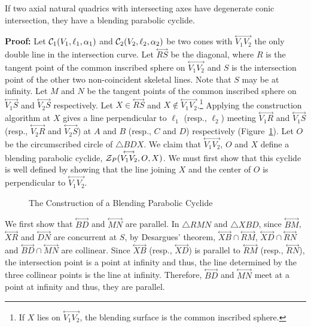 \begin{lemma}
\label{lemma:three-line-cyclide}
     If two axial natural quadrics with intersecting axes have degenerate conic
intersection, they have a blending parabolic cyclide.
\end{lemma}
{\bf Proof:}  Let ${\cal C}_1(V_1,\ell_1,\alpha_1)$ and
${\cal C}_2(V_2,\ell_2,\alpha_2)$ be two cones with
$\stackrel{\longleftrightarrow}{V_1V_2}$ the only double line in the
intersection curve.  Let $\stackrel{\longleftrightarrow}{RS}$ be the diagonal,
where $R$ is the tangent point of the common inscribed 
sphere on $\stackrel{\longleftrightarrow}{V_1V_2}$ and $S$ is the intersection
point of the other two non-coincident skeletal lines.  Note that $S$ may be
at infinity.  Let $M$ and $N$ be the tangent points of the common inscribed 
sphere on $\stackrel{\longleftrightarrow}{V_1S}$ and
$\stackrel{\longleftrightarrow}{V_2S}$ respectively.
Let $X\in\stackrel{\longleftrightarrow}{RS}$ and 
$X\not\in\stackrel{\longleftrightarrow}{V_1V_2}$.\footnote{If $X$ lies on
$\stackrel{\longleftrightarrow}{V_1V_2}$, the blending surface is the common
inscribed sphere.}
Applying the construction algorithm at $X$ gives a
line perpendicular to $\ell_1$ (resp., $\ell_2$) meeting
$\stackrel{\longleftrightarrow}{V_1R}$ and
$\stackrel{\longleftrightarrow}{V_1S}$ (resp.,
$\stackrel{\longleftrightarrow}{V_2R}$ and
$\stackrel{\longleftrightarrow}{V_2S}$) at $A$ and $B$ (resp., $C$ and $D$)
respectively (Figure~\ref{fig:parabolic-construct}).  Let $O$ be the 
circumscribed circle of $\bigtriangleup BDX$.  We claim that 
$\stackrel{\longleftrightarrow}{V_1V_2}$, $O$ and $X$ define a blending
parabolic cyclide, ${\cal Z}_P(\stackrel{\longleftrightarrow}{V_1V_2},O,X)$.
We must first show that this cyclide is well defined by showing that the line 
joining $X$ and the center of $O$ is perpendicular to
$\stackrel{\longleftrightarrow}{V_1V_2}$.
\begin{figure}
\vspace{5.5cm}
\caption{The Construction of a Blending Parabolic Cyclide}
\label{fig:parabolic-construct}
\end{figure}

     We first show that $\stackrel{\longleftrightarrow}{BD}$ and
$\stackrel{\longleftrightarrow}{MN}$ are parallel.
In $\bigtriangleup RMN$ and $\bigtriangleup XBD$, since
$\stackrel{\longleftrightarrow}{BM}$,
$\stackrel{\longleftrightarrow}{XR}$ and
$\stackrel{\longleftrightarrow}{DN}$ are concurrent at $S$, by Desargues'
theorem, 
$\stackrel{\longleftrightarrow}{XB}\cap\stackrel{\longleftrightarrow}{RM}$,
$\stackrel{\longleftrightarrow}{XD}\cap\stackrel{\longleftrightarrow}{RN}$ and
$\stackrel{\longleftrightarrow}{BD}\cap\stackrel{\longleftrightarrow}{MN}$
are collinear.  Since $\stackrel{\longleftrightarrow}{XB}$ (resp.,
$\stackrel{\longleftrightarrow}{XD}$) is parallel to
$\stackrel{\longleftrightarrow}{RM}$ (resp.,
$\stackrel{\longleftrightarrow}{RN}$), the intersection point is a point at
infinity and thus, the line determined by the three collinear points is the
line at infinity.  Therefore, 
$\stackrel{\longleftrightarrow}{BD}$ and
$\stackrel{\longleftrightarrow}{MN}$ meet at a point at infinity and thus,
they are parallel.

